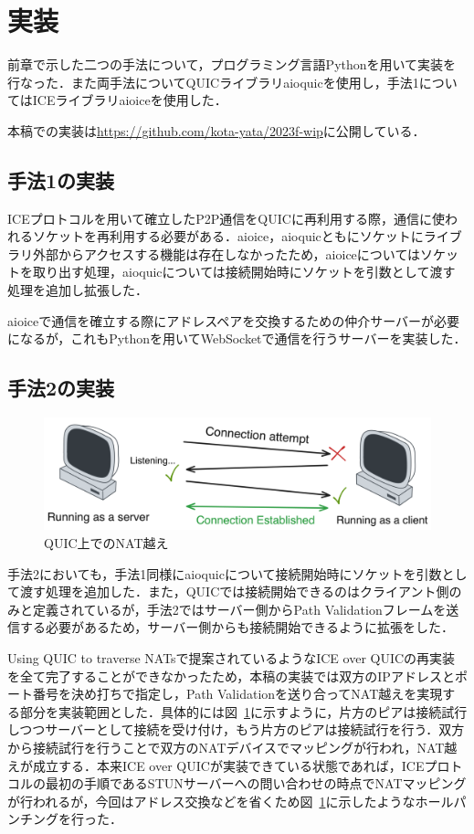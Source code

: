 \section{実装}
前章で示した二つの手法について，プログラミング言語Pythonを用いて実装を行なった．また両手法についてQUICライブラリaioquic\cite{aioquic}を使用し，手法1についてはICEライブラリaioice\cite{aioice}を使用した．

本稿での実装は\url{https://github.com/kota-yata/2023f-wip}に公開している．

\subsection{手法1の実装}

ICEプロトコルを用いて確立したP2P通信をQUICに再利用する際，通信に使われるソケットを再利用する必要がある．aioice，aioquicともにソケットにライブラリ外部からアクセスする機能は存在しなかったため，aioiceについてはソケットを取り出す処理，aioquicについては接続開始時にソケットを引数として渡す処理を追加し拡張した．

aioiceで通信を確立する際にアドレスペアを交換するための仲介サーバーが必要になるが，これもPythonを用いてWebSocketで通信を行うサーバーを実装した．

\subsection{手法2の実装}
\begin{figure}[h]
  \centering
  \includegraphics[width=\linewidth]{figs/implement-2.png}
  \caption{QUIC上でのNAT越え}
  \label{fig:impl-2}
\end{figure}
手法2においても，手法1同様にaioquicについて接続開始時にソケットを引数として渡す処理を追加した．また，QUICでは接続開始できるのはクライアント側のみと定義されているが，手法2ではサーバー側からPath Validationフレームを送信する必要があるため，サーバー側からも接続開始できるように拡張をした．

Using QUIC to traverse NATsで提案されているようなICE over QUICの再実装を全て完了することができなかったため，本稿の実装では双方のIPアドレスとポート番号を決め打ちで指定し，Path Validationを送り合ってNAT越えを実現する部分を実装範囲とした．具体的には図~\ref{fig:impl-2}に示すように，片方のピアは接続試行しつつサーバーとして接続を受け付け，もう片方のピアは接続試行を行う．双方から接続試行を行うことで双方のNATデバイスでマッピングが行われ，NAT越えが成立する．本来ICE over QUICが実装できている状態であれば，ICEプロトコルの最初の手順であるSTUNサーバーへの問い合わせの時点でNATマッピングが行われるが，今回はアドレス交換などを省くため図~\ref{fig:impl-2}に示したようなホールパンチングを行った．
